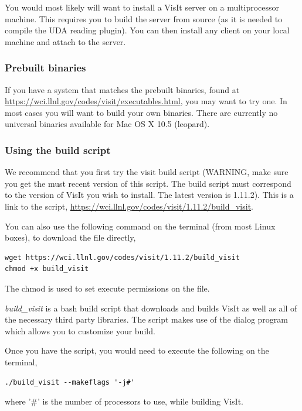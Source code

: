 \documentclass[12pt]{article}
\begin{document}
You would most likely will want to install a VisIt server on a
multiprocessor machine. This requires you to build the server from
source (as it is needed to compile the UDA reading plugin). You can
then install any client on your local machine and attach to the
server.

\subsubsection{Prebuilt binaries}
\label{subsec:PrebuiltBinaries}

If you have a system that matches the prebuilt binaries, found at
\url{https://wci.llnl.gov/codes/visit/executables.html}, you may want
to try one. In most cases you will want to build your own
binaries. There are currently no universal binaries available for Mac
OS X 10.5 (leopard).

\subsubsection{Using the build script}
\label{subsec:UsingTheBuildScript}

We recommend that you first try the visit build script (WARNING, make
sure you get the must recent version of this script. The build script
must correspond to the version of VisIt you wish to install. The
latest version is 1.11.2). This is a link to the script,
\url{https://wci.llnl.gov/codes/visit/1.11.2/build\_visit}.

You can also use the following command on the terminal (from most
Linux boxes), to download the file directly,

\begin{verbatim}
wget https://wci.llnl.gov/codes/visit/1.11.2/build_visit
chmod +x build_visit
\end{verbatim}
The chmod is used to set execute permissions on the file.

\emph{build\_visit} is a bash build script that downloads and builds VisIt as
well as all of the necessary third party libraries. The script makes
use of the dialog program which allows you to customize your build.

Once you have the script, you would need to execute the following on
the terminal,

\begin{verbatim}
./build_visit --makeflags '-j#'
\end{verbatim}
where '\#' is the number of processors to use, while building VisIt.
\end{document}
